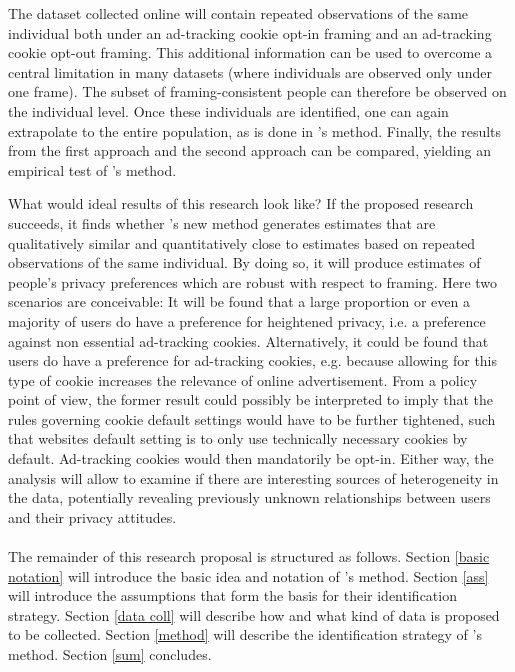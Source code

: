 The dataset collected online will contain repeated observations of the same individual both under an ad-tracking cookie opt-in framing and an ad-tracking cookie opt-out framing.
This additional information can be used to overcome a central limitation in many datasets (where individuals are observed only under one frame).
The subset of framing-consistent people can therefore be observed on the individual level. Once these individuals are identified, one can again extrapolate to the entire population, as
is done in \textcite{goldin2020}'s method. Finally, the results from the first approach and the second approach can be compared, yielding an empirical test of 
\textcite{goldin2020}'s method.

What would ideal results of this research look like? If the proposed research succeeds, it finds whether \textcite{goldin2020}'s new method generates estimates that are 
qualitatively similar and quantitatively close to estimates based on repeated observations of the same individual.
By doing so, it will produce estimates of people's privacy preferences which are robust with respect to framing. Here two scenarios are conceivable: It will
be found that a large proportion or even a majority of users do have a preference for heightened privacy, i.e. a preference against non essential ad-tracking cookies.
Alternatively, it could be found that users do have a preference for ad-tracking cookies, e.g. because allowing for this type of cookie increases the relevance of online advertisement.
From a policy point of view, the former result could possibly be interpreted to imply that the rules governing cookie default settings would have to be
further tightened, such that websites default setting is to only use technically necessary cookies by default. Ad-tracking cookies would then mandatorily be opt-in. Either way,
the analysis will allow to examine if there are interesting sources of heterogeneity in the data, potentially revealing previously unknown relationships between
users and their privacy attitudes.
\\
\\
The remainder of this research proposal is structured as follows. Section \ref{basic notation} will introduce the basic idea and notation of \textcite{goldin2020}'s method. Section
\ref{ass} will introduce the assumptions that form the basis for their identification strategy. Section \ref{data coll} will describe how and what kind of data is proposed to be collected.
Section \ref{method} will describe the identification strategy of \textcite{goldin2020}'s method. Section \ref{sum} concludes.







